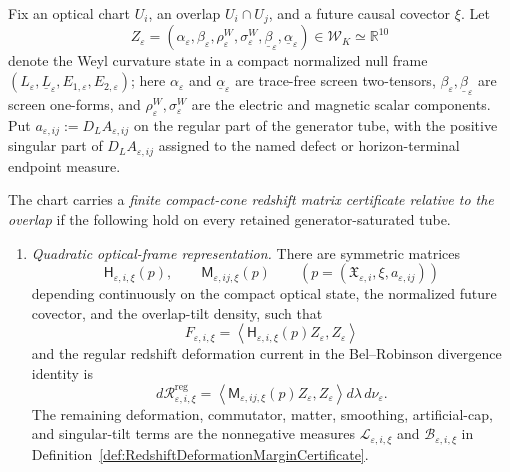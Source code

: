 \begin{definition}\label{def:FiniteCompactConeRedshiftMatrixCertificate}
Fix an optical chart $U_i$, an overlap $U_i\cap U_j$, and a future causal covector $\xi$.  Let
\[
    Z_\varepsilon
    =
    (\alpha_\varepsilon,\beta_\varepsilon,\rho_\varepsilon^W,\sigma_\varepsilon^W,
    \underline\beta_\varepsilon,\underline\alpha_\varepsilon)
    \in \mathcal W_K\simeq\mathbb R^{10}
\]
denote the Weyl curvature state in a compact normalized null frame
$(L_\varepsilon,\underline L_\varepsilon,E_{1,\varepsilon},E_{2,\varepsilon})$; here
$\alpha_\varepsilon$ and $\underline\alpha_\varepsilon$ are trace-free screen
two-tensors, $\beta_\varepsilon,\underline\beta_\varepsilon$ are screen one-forms,
and $\rho_\varepsilon^W,\sigma_\varepsilon^W$ are the electric and magnetic scalar
components.  Put $a_{\varepsilon,ij}:=D_LA_{\varepsilon,ij}$ on the regular part
of the generator tube, with the positive singular part of $D_LA_{\varepsilon,ij}$
assigned to the named defect or horizon-terminal endpoint measure.

The chart carries a \emph{finite compact-cone redshift matrix certificate relative
to the overlap} if the following hold on every retained generator-saturated tube.
\begin{enumerate}
    \item \emph{Quadratic optical-frame representation.}  There are symmetric
    matrices
    \[
        \mathsf H_{\varepsilon,i,\xi}(p),
        \qquad
        \mathsf M_{\varepsilon,ij,\xi}(p)
        \qquad (p=(\mathfrak X_{\varepsilon,i},\xi,a_{\varepsilon,ij}))
    \]
    depending continuously on the compact optical state, the normalized future
    covector, and the overlap-tilt density, such that
    \[
        F_{\varepsilon,i,\xi}
        =
        \left\langle
        \mathsf H_{\varepsilon,i,\xi}(p)Z_\varepsilon,Z_\varepsilon
        \right\rangle
    \]
    and the regular redshift deformation current in the Bel--Robinson divergence
    identity is
    \[
        d\mathcal R^{\mathrm{reg}}_{\varepsilon,i,\xi}
        =
        \left\langle
        \mathsf M_{\varepsilon,ij,\xi}(p)Z_\varepsilon,Z_\varepsilon
        \right\rangle d\lambda\,d\nu_\varepsilon .
    \]
    The remaining deformation, commutator, matter, smoothing, artificial-cap, and
    singular-tilt terms are the nonnegative measures
    $\mathcal L_{\varepsilon,i,\xi}$ and $\mathcal B_{\varepsilon,i,\xi}$ in
    Definition~\ref{def:RedshiftDeformationMarginCertificate}.


\end{enumerate}
\end{definition}
